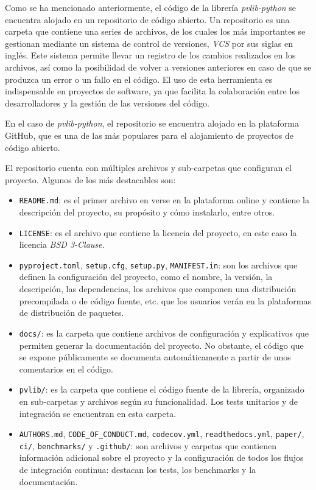 Como se ha mencionado anteriormente, el código de la librería \textit{pvlib-python} se encuentra alojado en un repositorio de código abierto. Un repositorio es una carpeta que contiene una series de archivos, de los cuales los más importantes se gestionan mediante un sistema de control de versiones, \textit{VCS} por sus siglas en inglés. Este sistema permite llevar un registro de los cambios realizados en los archivos, así como la posibilidad de volver a versiones anteriores en caso de que se produzca un error o un fallo en el código. El uso de esta herramienta es indispensable en proyectos de software, ya que facilita la colaboración entre los desarrolladores y la gestión de las versiones del código.

En el caso de \textit{pvlib-python}, el repositorio se encuentra alojado en la plataforma GitHub, que es una de las más populares para el alojamiento de proyectos de código abierto.

El repositorio cuenta con múltiples archivos y sub-carpetas que configuran el proyecto. Algunos de los más destacables son:

\begin{itemize}
      \item \texttt{README.md}: es el primer archivo en verse en la plataforma online y contiene la descripción del proyecto, su propósito y cómo instalarlo, entre otros.
      \item \texttt{LICENSE}: es el archivo que contiene la licencia del proyecto, en este caso la licencia \textit{BSD 3-Clause}.
      \item \texttt{pyproject.toml}, \texttt{setup.cfg}, \texttt{setup.py}, \texttt{MANIFEST.in}: son los archivos que definen la configuración del proyecto, como el nombre, la versión, la descripción, las dependencias, los archivos que componen una distribución precompilada o de código fuente, etc. que los usuarios verán en la plataformas de distribución de paquetes.
      \item \texttt{docs/}: es la carpeta que contiene archivos de configuración y explicativos que permiten generar la documentación del proyecto. No obstante, el código que se expone públicamente se documenta automáticamente a partir de unos comentarios en el código.
      \item \texttt{pvlib/}: es la carpeta que contiene el código fuente de la librería, organizado en sub-carpetas y archivos según su funcionalidad. Los tests unitarios y de integración se encuentran en esta carpeta.
      \item \texttt{AUTHORS.md}, \texttt{CODE\_OF\_CONDUCT.md}, \texttt{codecov.yml}, \texttt{readthedocs.yml}, \texttt{paper/}, \texttt{ci/}, \texttt{benchmarks/} y \texttt{.github/}: son archivos y carpetas que contienen información adicional sobre el proyecto y la configuración de todos los flujos de integración continua: destacan los tests, los benchmarks y la documentación.

\end{itemize}

